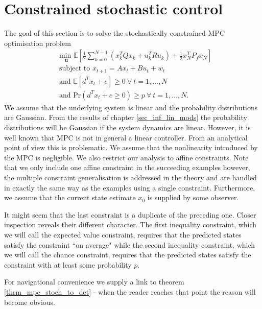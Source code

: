 \section{Constrained stochastic control}
\label{sec_lin_mpc_constained}
The goal of this section is to solve the stochastically constrained MPC optimisation problem
\begin{equation}
\begin{aligned}
&\underset{\mathbf{u}}{\text{min }} \mathbb{E}\left[ \frac{1}{2}\sum_{k=0}^{N-1} \left( x_k^TQx_k + u_k^TRu_k \right) + \frac{1}{2}x_N^TP_fx_N \right] \\
& \text{subject to } x_{t+1}=Ax_t+Bu_t + w_t \\
& \text{and } \mathbb{E}[d^Tx_t + e] \geq 0 ~\forall ~t=1,\hdots,N \\
& \text{and } \text{Pr}(d^Tx_t + e \geq 0) \geq p ~\forall ~t=1,\hdots,N.
\end{aligned}
\label{eq_mpc_constrained_linmod}
\end{equation}
We assume that the underlying system is linear and the probability distributions are Gaussian. From the results of chapter \ref{sec_inf_lin_mods} the probability distributions will be Gaussian if the system dynamics are linear. However, it is well known \cite{mac} that MPC is not in general a linear controller. From an analytical point of view this is problematic. We assume that the nonlinearity introduced by the MPC is negligible. We also restrict our analysis to affine constraints. Note that we only include one affine constraint in the succeeding examples however, the multiple constraint generalisation is addressed in the theory and are handled in exactly the same way as the examples using a single constraint. Furthermore, we assume that the current state estimate $x_0$ is supplied by some observer.

It might seem that the last constraint is a duplicate of the preceding one. Closer inspection reveals their different character. The first inequality constraint, which we will call the expected value constraint, requires that the predicted states satisfy the constraint ``on average" while the second inequality constraint, which we will call the chance constraint, requires that the predicted states satisfy the constraint with at least some probability $p$. 

For navigational convenience we supply a link to theorem \ref{thrm_mpc_stoch_to_det} - when the reader reaches that point the reason will become obvious.

